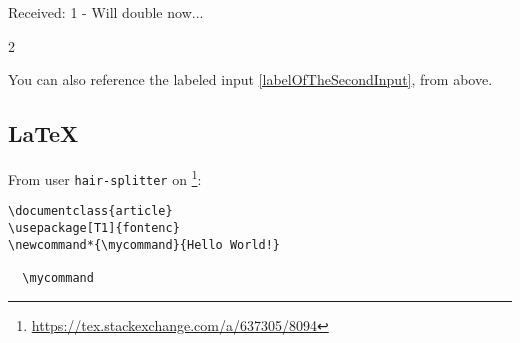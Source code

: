 \begin{pyprint}
Received: 1 - Will double now...
\end{pyprint}

\begin{pyout}
2
\end{pyout}
% 
You can also reference the labeled input \ref{labelOfTheSecondInput}, from above.


\subsection{\texorpdfstring{\LaTeX}{LaTeX}}

From user \texttt{hair-splitter} on \footnote{\url{https://tex.stackexchange.com/a/637305/8094}}:

\begin{lstlisting}[style=latexstyle]
\documentclass{article}
\usepackage[T1]{fontenc}
\newcommand*{\mycommand}{Hello World!}

  \mycommand

\end{lstlisting}

